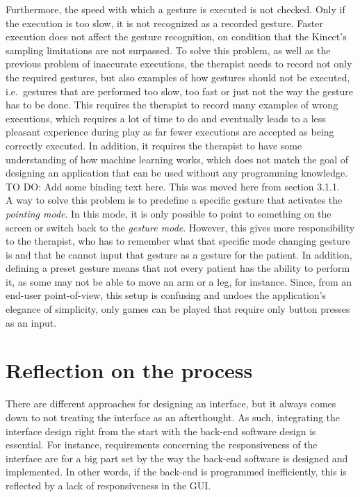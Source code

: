 Furthermore, the speed with which a gesture is executed is not checked. Only if the execution is too slow, it is not recognized as a recorded gesture. Faster execution does not affect the gesture recognition, on condition that the Kinect's sampling limitations are not surpassed. To solve this problem, as well as the previous problem of inaccurate executions, the therapist needs to record not only the required gestures, but also examples of how gestures should not be executed, i.e.\ gestures that are performed too slow, too fast or just not the way the gesture has to be done. This requires the therapist to record many examples of wrong executions, which requires a lot of time to do and eventually leads to a less pleasant experience during play as far fewer executions are accepted as being correctly executed. In addition, it requires the therapist to have some understanding of how machine learning works, which does not match the goal of designing an application that can be used without any programming knowledge.\\


TO DO: Add some binding text here. This was moved here from section 3.1.1.\\
A way to solve this problem is to predefine a specific gesture that activates the \emph{pointing mode}. In this mode, it is only possible to point to something on the screen or switch back to the \emph{gesture mode}. However, this gives more responsibility to the therapist, who has to remember what that specific mode changing gesture is and that he cannot input that gesture as a gesture for the patient. In addition, defining a preset gesture means that not every patient has the ability to perform it, as some may not be able to move an arm or a leg, for instance. Since, from an end-user point-of-view, this setup is confusing and undoes the application's elegance of simplicity, only games can be played that require only button presses as an input.





\section{Reflection on the process}

There are different approaches for designing an interface, but it always comes down to not treating the interface as an afterthought. As such, integrating the interface design right from the start with the back-end software design is essential. For instance, requirements concerning the responsiveness of the interface are for a big part set by the way the back-end software is designed and implemented. In other words, if the back-end is programmed inefficiently, this is reflected by a lack of responsiveness in the GUI.\\

